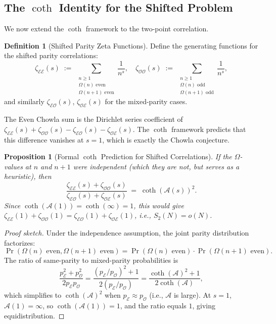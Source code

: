 \documentclass[11pt,a4paper]{article}
\theoremstyle{plain}
\newtheorem{proposition}[theorem]{Proposition}
\theoremstyle{definition}
\newtheorem{definition}[theorem]{Definition}
\newcommand{\EE}{\mathcal{E}}
\newcommand{\OO}{\mathcal{O}}
\newcommand{\cA}{\mathcal{A}}
\begin{document}
\subsection{The $\coth$ Identity for the Shifted Problem}

We now extend the $\coth$ framework to the two-point correlation.

\begin{definition}[Shifted Parity Zeta Functions]
Define the generating functions for the shifted parity correlations:
\begin{equation}\label{eq:shifted-zeta}
\zeta_{\EE\EE}(s) \;:=\; \sum_{\substack{n \geq 1 \\ \Omega(n) \text{ even} \\ \Omega(n+1) \text{ even}}} \frac{1}{n^s}, \quad \zeta_{\OO\OO}(s) \;:=\; \sum_{\substack{n \geq 1 \\ \Omega(n) \text{ odd} \\ \Omega(n+1) \text{ odd}}} \frac{1}{n^s},
\end{equation}
and similarly $\zeta_{\EE\OO}(s)$, $\zeta_{\OO\EE}(s)$ for the mixed-parity cases.
\end{definition}

The Even Chowla sum is the Dirichlet series coefficient of $\zeta_{\EE\EE}(s) + \zeta_{\OO\OO}(s) - \zeta_{\EE\OO}(s) - \zeta_{\OO\EE}(s)$. The $\coth$ framework predicts that this difference vanishes at $s = 1$, which is exactly the Chowla conjecture.

\begin{proposition}[Formal $\coth$ Prediction for Shifted Correlations]\label{prop:shifted-coth}
If the $\Omega$-values at $n$ and $n+1$ were independent (which they are not, but serves as a heuristic), then
\begin{equation}\label{eq:shifted-prediction}
\frac{\zeta_{\EE\EE}(s) + \zeta_{\OO\OO}(s)}{\zeta_{\EE\OO}(s) + \zeta_{\OO\EE}(s)} \;=\; \coth(\cA(s))^2.
\end{equation}
Since $\coth(\cA(1)) = \coth(\infty) = 1$, this would give $\zeta_{\EE\EE}(1) + \zeta_{\OO\OO}(1) = \zeta_{\EE\OO}(1) + \zeta_{\OO\EE}(1)$, i.e., $S_2(N) = o(N)$.
\end{proposition}

\begin{proof}[Proof sketch]
Under the independence assumption, the joint parity distribution factorizes:
\[
\Pr(\Omega(n) \text{ even}, \Omega(n+1) \text{ even}) = \Pr(\Omega(n) \text{ even}) \cdot \Pr(\Omega(n+1) \text{ even}).
\]
The ratio of same-parity to mixed-parity probabilities is
\[
\frac{p_{\EE}^2 + p_{\OO}^2}{2 p_{\EE} p_{\OO}} = \frac{(p_{\EE}/p_{\OO})^2 + 1}{2(p_{\EE}/p_{\OO})} = \frac{\coth(\cA)^2 + 1}{2\coth(\cA)},
\]
which simplifies to $\coth(\cA)^2$ when $p_{\EE} \approx p_{\OO}$ (i.e., $\cA$ is large). At $s = 1$, $\cA(1) = \infty$, so $\coth(\cA(1)) = 1$, and the ratio equals $1$, giving equidistribution.
\end{proof}
\end{document}
